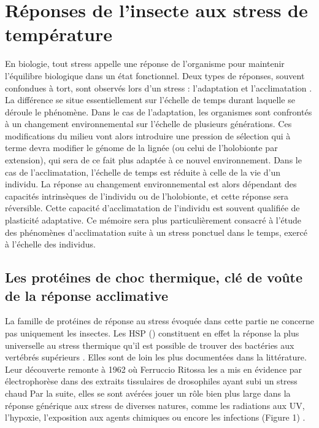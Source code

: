 \section{Réponses de l'insecte aux stress de température}

En biologie, tout stress appelle une réponse de l'organisme pour maintenir l'équilibre biologique dans un état fonctionnel.
Deux types de réponses, souvent confondues à tort, sont observés lors d'un stress : l'adaptation et l'acclimatation \cite{somero2010}.
La différence se situe essentiellement sur l'échelle de temps durant laquelle se déroule le phénomène.
Dans le cas de l'adaptation, les organismes sont confrontés à un changement environnemental sur l'échelle de plusieurs générations.
Ces modifications du milieu vont alors introduire une pression de sélection qui à terme devra modifier le génome de la lignée (ou celui de l'holobionte par extension), qui sera de ce fait plus adaptée à ce nouvel environnement.
Dans le cas de l'acclimatation, l'échelle de temps est réduite à celle de la vie d'un individu. La réponse au changement environnemental est alors dépendant des capacités intrinsèques de l'individu ou de l'holobionte, et cette réponse sera réversible.
Cette capacité d'acclimatation de l'individu est souvent qualifiée de plasticité adaptative.
Ce mémoire sera plus particulièrement consacré à l'étude des
phénomènes d'acclimatation suite à un stress ponctuel dans le temps, exercé à l'échelle des individus.

	\subsection{Les protéines de choc thermique, clé de voûte de la réponse acclimative}

	La famille de protéines de réponse au stress évoquée dans cette partie ne concerne pas uniquement les insectes.
	Les HSP () constituent en effet la réponse la plus universelle au stress thermique qu'il est possible de trouver des bactéries aux vertébrés supérieurs \cite{lindquist1986}.
	Elles sont de loin les plus documentées dans la littérature.
	Leur découverte remonte à 1962 où Ferruccio Ritossa les a mis en évidence par électrophorèse dans des extraits tissulaires de drosophiles ayant subi un stress chaud \cite{ritossa1996, ritossa1962} %
	Par la suite, elles se sont avérées jouer un rôle bien plus large dans la réponse générique aux stress de diverses natures, comme les radiations aux UV, l'hypoxie, l'exposition aux agents chimiques ou encore les infections (Figure 1) \cite{sorensen2003}.


